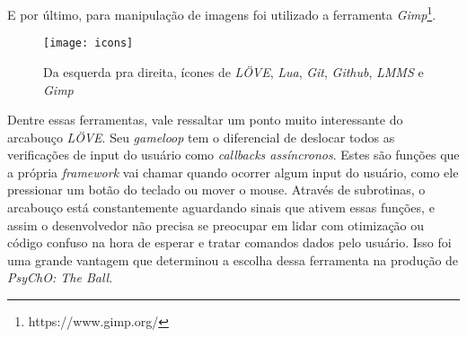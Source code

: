 E por último, para manipulação de imagens foi utilizado a ferramenta \textit{Gimp}\footnote{https://www.gimp.org/}.

\begin{figure}[h!]
\texttt{[image: icons]}
\centering
\caption{Da esquerda pra direita, ícones de \textit{LÖVE}, \textit{Lua}, \textit{Git}, \textit{Github}, \textit{LMMS} e \textit{Gimp}}
\end{figure}

Dentre essas ferramentas, vale ressaltar um ponto muito interessante do arcabouço \textit{LÖVE}. Seu \textit{gameloop} tem o diferencial de deslocar todos as verificações de input do usuário como \textit{callbacks assíncronos}. Estes são funções que a própria \textit{framework} vai chamar quando ocorrer algum input do usuário, como ele pressionar um botão do teclado ou mover o mouse. Através de subrotinas, o arcabouço está constantemente aguardando sinais que ativem essas funções, e assim o desenvolvedor não precisa se preocupar em lidar com otimização ou código confuso na hora de esperar e tratar comandos dados pelo usuário. Isso foi uma grande vantagem que determinou a escolha dessa ferramenta na produção de \textit{PsyChO: The Ball}.

